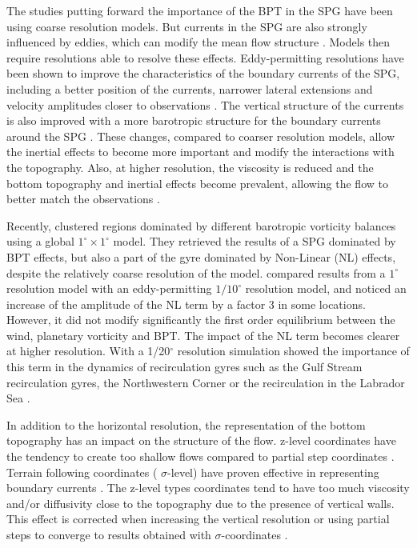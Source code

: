\documentclass[os, manuscript]{copernicus}
\begin{document}
The studies putting forward the importance of the BPT in the SPG have been using coarse resolution models. But currents in the SPG are also strongly influenced by eddies, which can modify the mean flow structure \citep{MW08}. Models then require resolutions able to resolve these effects. Eddy-permitting resolutions have been shown to improve the characteristics of the boundary currents of the SPG, including a better position of the currents, narrower lateral extensions and velocity amplitudes closer to observations \citep{treguier2005,danek2019}. The vertical structure of the currents is also improved with a more barotropic structure for the boundary currents around the SPG \citep{marzocchi2015}. These changes, compared to coarser resolution models, allow the inertial effects to become more important and modify the interactions with the topography. Also, at higher resolution, the viscosity is reduced and the bottom topography and inertial effects become prevalent, allowing the flow to better match the observations \citep{spence2012, schoonover2016}. 

Recently, \citet{sonnewald2019} clustered regions dominated by different barotropic vorticity balances using a global $1^{\circ} \times 1^{\circ}$ model. They retrieved the results of a SPG dominated by BPT effects, but also a part of the gyre dominated by Non-Linear (NL) effects, despite the relatively coarse resolution of the model. \citet{yeager2015} compared results from a $1^{\circ}$ resolution model with an eddy-permitting $1/10^{\circ}$ resolution model, and noticed an increase of the amplitude of the NL term by a factor 3 in some locations. However, it did not modify significantly the first order equilibrium between the wind, planetary vorticity and BPT. The impact of the NL term becomes clearer at higher resolution. With a 1/20$^{\circ}$ resolution simulation \citet{wang2017} showed the importance of this term in the dynamics of recirculation gyres such as the Gulf Stream recirculation gyres, the Northwestern Corner or the recirculation in the Labrador Sea \citep{lavender2000}.

In addition to the horizontal resolution, the representation of the bottom topography has an impact on the structure of the flow. z-level coordinates have the tendency to create too shallow flows compared to partial step coordinates \citep{pacanowski1998}. Terrain following coordinates ( $\sigma$-level) have proven effective in representing boundary currents \citep{schoonover2016,ezer2016}. The z-level types coordinates tend to have too much viscosity and/or diffusivity close to the topography due to the presence of vertical walls. This effect is corrected when increasing the vertical resolution or using partial steps to converge to results obtained with $\sigma$-coordinates \citep{ezer2004}.
\end{document}
